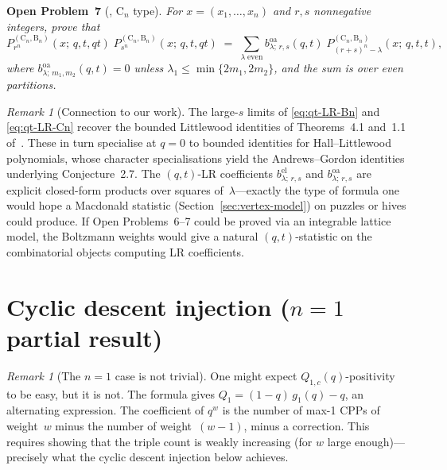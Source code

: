 \documentclass[11pt]{article}
\theoremstyle{plain}
\theoremstyle{definition}
\theoremstyle{remark}
\newtheorem{remark}[theorem]{Remark}
\begin{document}
\medskip\noindent\textbf{Open Problem~7}
(\cite{rains-warnaar-2015}, $\mathrm{C}_n$ type).
\emph{For $x = (x_1, \ldots, x_n)$ and $r,s$ nonnegative integers,
prove that}
\begin{equation}\label{eq:qt-LR-Cn}
  P^{(\mathrm{C}_n,\mathrm{B}_n)}_{r^n}(x;\,q,t,qt)\;
  P^{(\mathrm{C}_n,\mathrm{B}_n)}_{s^n}(x;\,q,t,qt)
  \;=\; \sum_{\lambda\;\mathrm{even}}
  b^{\mathrm{oa}}_{\lambda;\,r,s}(q,t)\;
  P^{(\mathrm{C}_n,\mathrm{B}_n)}_{(r+s)^n - \lambda}(x;\,q,t,t),
\end{equation}
\emph{where $b^{\mathrm{oa}}_{\lambda;\,m_1,m_2}(q,t) = 0$ unless
$\lambda_1 \leqslant \min\{2m_1, 2m_2\}$, and the sum is over
even partitions.}

\begin{remark}[Connection to our work]
The large-$s$ limits of \eqref{eq:qt-LR-Bn} and \eqref{eq:qt-LR-Cn}
recover the bounded Littlewood identities of Theorems~4.1 and~1.1
of~\cite{rains-warnaar-2015}. These in turn specialise at $q = 0$ to
bounded identities for Hall--Littlewood polynomials, whose character
specialisations yield the Andrews--Gordon identities underlying
Conjecture~2.7. The $(q,t)$-LR coefficients
$b^{\mathrm{el}}_{\lambda;\,r,s}$ and $b^{\mathrm{oa}}_{\lambda;\,r,s}$
are explicit closed-form products over squares of~$\lambda$---exactly
the type of formula one would hope a Macdonald statistic
(Section~\ref{sec:vertex-model}) on puzzles or hives could produce.
If Open Problems~6--7 could be proved via an integrable lattice model,
the Boltzmann weights would give a natural $(q,t)$-statistic on the
combinatorial objects computing LR coefficients.
\end{remark}

\section{Cyclic descent injection ($n=1$ partial result)}
\label{sec:cyclic-descent}

\begin{remark}[The $n = 1$ case is not trivial]\label{rem:n1-nontrivial}
One might expect $Q_{1,c}(q)$-positivity to be easy, but it is not.
The formula gives $Q_1 = (1-q)\, g_1(q) - q$, an alternating expression.
The coefficient of $q^w$ is the number of max-1 CPPs of weight~$w$
minus the number of weight~$(w-1)$, minus a correction.
This requires showing that the triple count is weakly increasing
(for $w$ large enough)---precisely what the cyclic descent
injection below achieves.
\end{remark}
\end{document}
